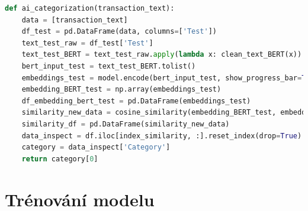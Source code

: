 \begin{lstlisting}[language=python,caption={Funkce \texttt{ai\_categorization(text)}.},label={lst:aicategorizace},breaklines=true] 
def ai_categorization(transaction_text):
    data = [transaction_text]
    df_test = pd.DataFrame(data, columns=['Test'])
    text_test_raw = df_test['Test']
    text_test_BERT = text_test_raw.apply(lambda x: clean_text_BERT(x))
    bert_input_test = text_test_BERT.tolist()
    embeddings_test = model.encode(bert_input_test, show_progress_bar=True)
    embedding_BERT_test = np.array(embeddings_test)
    df_embedding_bert_test = pd.DataFrame(embeddings_test)
    similarity_new_data = cosine_similarity(embedding_BERT_test, embedding_BERT)
    similarity_df = pd.DataFrame(similarity_new_data)
    data_inspect = df.iloc[index_similarity, :].reset_index(drop=True)
    category = data_inspect['Category']
    return category[0]
\end{lstlisting}

\section{Trénování modelu}

